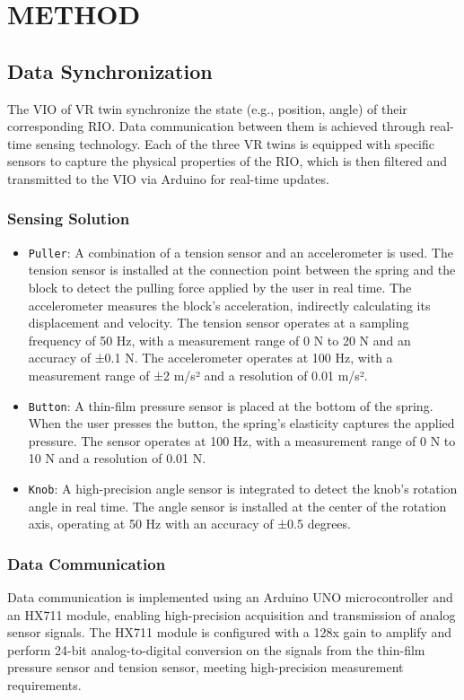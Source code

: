 \documentclass[runningheads]{llncs}
\begin{document}
\section{METHOD}
\subsection{Data Synchronization}
The VIO of VR twin synchronize the state (e.g., position, angle) of their corresponding RIO. Data communication between them is achieved through real-time sensing technology. Each of the three VR twins is equipped with specific sensors to capture the physical properties of the RIO, which is then filtered and transmitted to the VIO via Arduino for real-time updates.

\subsubsection{Sensing Solution}
\begin{itemize}
  \item {\texttt{Puller}}: A combination of a tension sensor and an accelerometer is used. The tension sensor is installed at the connection point between the spring and the block to detect the pulling force applied by the user in real time. The accelerometer measures the block's acceleration, indirectly calculating its displacement and velocity. The tension sensor operates at a sampling frequency of 50 Hz, with a measurement range of 0 N to 20 N and an accuracy of ±0.1 N. The accelerometer operates at 100 Hz, with a measurement range of ±2 m/s² and a resolution of 0.01 m/s².

  \item {\texttt{Button}}: A thin-film pressure sensor is placed at the bottom of the spring. When the user presses the button, the spring's elasticity captures the applied pressure. The sensor operates at 100 Hz, with a measurement range of 0 N to 10 N and a resolution of 0.01 N.

  \item {\texttt{Knob}}: A high-precision angle sensor is integrated to detect the knob's rotation angle in real time. The angle sensor is installed at the center of the rotation axis, operating at 50 Hz with an accuracy of ±0.5 degrees.
\end{itemize}

\subsubsection{Data Communication}
Data communication is implemented using an Arduino UNO microcontroller and an HX711 module, enabling high-precision acquisition and transmission of analog sensor signals. The HX711 module is configured with a 128x gain to amplify and perform 24-bit analog-to-digital conversion on the signals from the thin-film pressure sensor and tension sensor, meeting high-precision measurement requirements.
\end{document}

